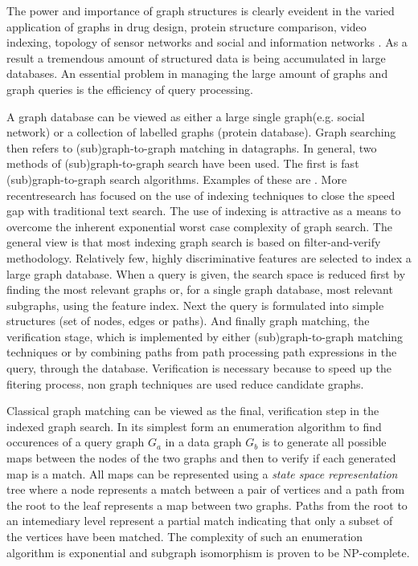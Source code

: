 The power and importance of graph structures is clearly eveident in the varied application of graphs in  drug design, protein structure comparison, video indexing, topology of sensor networks \cite{in_zang2011} and social and information networks\cite{in_williams2007} \cite{in_chen2007}. As a result a tremendous amount of structured data is being accumulated in large databases. An essential problem in managing the large amount of graphs and graph queries is the efficiency of query processing.

A graph database can  be viewed as either a large single graph(e.g. social network) or a collection of labelled graphs (protein database). Graph searching then refers to (sub)graph-to-graph matching in datagraphs\cite{sasha2002}. In general, two methods of (sub)graph-to-graph search have been used. The first is fast (sub)graph-to-graph search algorithms. Examples of these are \cite{ullmann1976}\cite{cordella2004_vf2}. More recentresearch has focused on the use of indexing techniques\cite{sasha2002} \cite{yan2005} \cite{he_singh2006} \cite{zhang2007} \cite{jiang2007} \cite{cheng2007} \cite{zhao2007} to close the speed gap with traditional text search. The use of indexing is attractive as a means to overcome the inherent exponential worst case complexity of graph search. The general view is that most indexing graph search is based on filter-and-verify methodology\cite{sasha}. Relatively few, highly discriminative features are selected to index a large graph database. When a query is given, the search space is reduced first by finding the most relevant graphs or, for a single graph database, most relevant subgraphs, using the feature index. Next the query is formulated into simple structures (set of nodes, edges or paths). And finally graph matching, the verification stage, which is implemented by either (sub)graph-to-graph matching techniques or by combining paths from path processing path expressions in the query, through the database. Verification is necessary because to speed up the fitering process, non graph techniques are used reduce candidate graphs.  


Classical graph matching can be viewed as the final, verification step in the indexed graph search. In its simplest form an enumeration algorithm to find occurences of a query graph $G_a$ in a data graph $G_b$ is to generate all possible maps between the nodes of the two graphs and then to verify if each generated map is a match. All maps can be represented using a \textit{state space representation} tree  where a node represents a match between a pair of vertices and a path from the root to the leaf represents a map between two graphs. Paths from the root to an intemediary level represent a partial match indicating that only a subset of the vertices have been matched. The complexity of such an enumeration algorithm is exponential and subgraph isomorphism is proven to be NP-complete\cite{garey_johnson1979_in_sasha2002(42)}.

